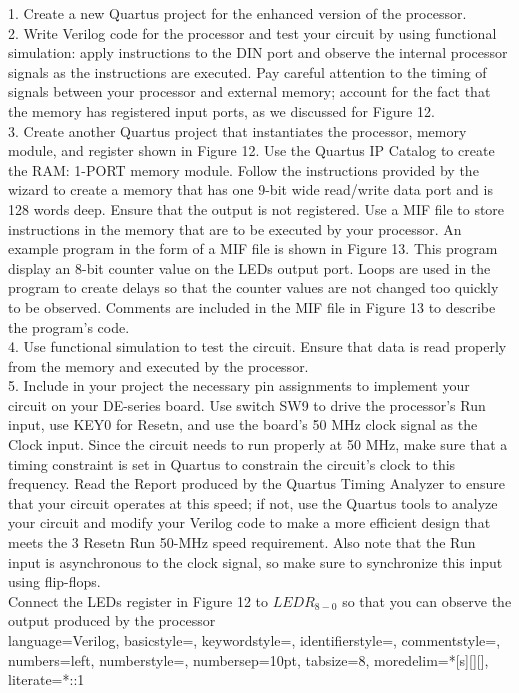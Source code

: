 1. Create a new Quartus project for the enhanced version of the processor.\\
2. Write Verilog code for the processor and test your circuit by using functional simulation: apply instructions
to the DIN port and observe the internal processor signals as the instructions are executed. Pay careful
attention to the timing of signals between your processor and external memory; account for the fact that the
memory has registered input ports, as we discussed for Figure 12.\\
3. Create another Quartus project that instantiates the processor, memory module, and register shown in Figure 12. Use the Quartus IP Catalog to create the RAM: 1-PORT memory module. Follow the instructions
provided by the wizard to create a memory that has one 9-bit wide read/write data port and is 128 words
deep. Ensure that the output is not registered. Use a MIF file to store instructions in the memory that are to
be executed by your processor. An example program in the form of a MIF file is shown in Figure 13. This
program display an 8-bit counter value on the LEDs output port. Loops are used in the program to create
delays so that the counter values are not changed too quickly to be observed. Comments are included in the
MIF file in Figure 13 to describe the program’s code.\\
4. Use functional simulation to test the circuit. Ensure that data is read properly from the memory and executed
by the processor.\\
5. Include in your project the necessary pin assignments to implement your circuit on your DE-series board.
Use switch SW9 to drive the processor’s Run input, use KEY0 for Resetn, and use the board’s 50 MHz
clock signal as the Clock input. Since the circuit needs to run properly at 50 MHz, make sure that a timing
constraint is set in Quartus to constrain the circuit’s clock to this frequency. Read the Report produced
by the Quartus Timing Analyzer to ensure that your circuit operates at this speed; if not, use the Quartus
tools to analyze your circuit and modify your Verilog code to make a more efficient design that meets the
3
Resetn
Run
50-MHz speed requirement. Also note that the Run input is asynchronous to the clock signal, so make sure
to synchronize this input using flip-flops.\\
Connect the LEDs register in Figure 12 to $LEDR_{8-0}$ so that you can observe the output produced by the
processor\\
\newpage
{}
{
    language=Verilog,
    basicstyle=\small\ttfamily,
    keywordstyle=\color{vblue},
    identifierstyle=\color{black},
    commentstyle=\color{vgreen},
    numbers=left,
    numberstyle=\tiny\color{black},
    numbersep=10pt,
    tabsize=8,
    moredelim=*[s][]{[}{]},
    literate=*{:}{:}1
}

